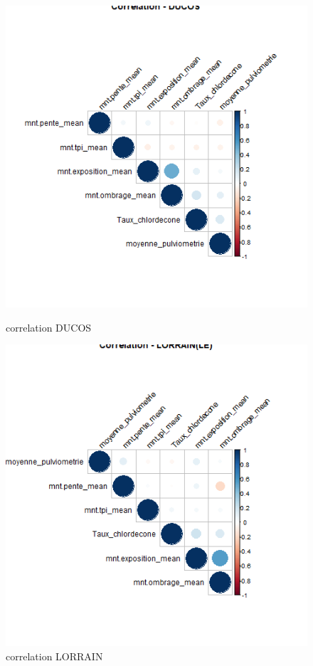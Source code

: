 \documentclass{report}
\begin{document}
\begin{figure}[H]
\begin{minipage}[t]{0.45\linewidth}
\centering
\includegraphics[width =
0.6\linewidth]{correlation_DUCOS.png}
\caption{correlation DUCOS}
\end{minipage}
\hfill
\begin{minipage}[t]{0.45\linewidth}
\includegraphics[width = 0.6
\linewidth]{correlation_LORRAIN(LE).png}
\caption{correlation LORRAIN}
\end{minipage}
\end{figure}
\end{document}
